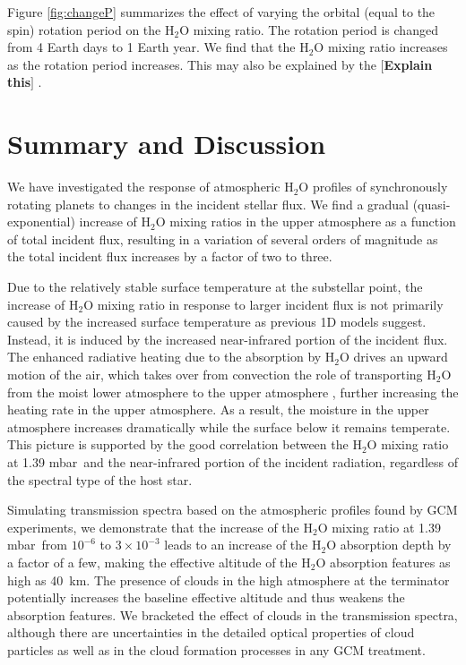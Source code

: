 \documentclass[11pt,numberedappendix,twocolappendix,]{emulateapj}
\def\water{H$_2$O }
\def\preslevel{1.39 mbar\ }
\def\memo#1{\color{red}$[${\bf #1}$]$ \color{black}}
\newcommand{\yf}[1]{{\color{orange}#1}}
\begin{document}
Figure \ref{fig:changeP} summarizes the effect of varying the orbital (equal to the spin) rotation period on the \water mixing ratio. 
The rotation period is changed from 4 Earth days to 1 Earth year. 
We find that the \water mixing ratio increases as the rotation period increases. 
This may also be explained by the 
\memo{Explain this}. 



\section{Summary and Discussion}
\label{s:summary}

We have investigated the response of atmospheric \water profiles of synchronously rotating planets to changes in the incident stellar flux. 
We find a gradual (quasi-exponential) increase of \water mixing ratios in the upper atmosphere as a function of total incident flux, resulting in a variation of several orders of magnitude as the total incident flux increases by a factor of two to three. 

Due to the relatively stable surface temperature at the substellar point, the increase of \water mixing ratio in response to larger incident flux is not primarily caused by the increased surface temperature as previous 1D models suggest. 
Instead, it is induced by the increased near-infrared portion of the incident flux. 
The enhanced radiative heating due to the absorption by \water drives an upward motion of the air, which takes over \yf{from convection} the role of transporting \water from the moist lower atmosphere to the upper atmosphere , further increasing the heating rate in the upper atmosphere.
As a result, the moisture in the upper atmosphere increases dramatically while the surface below it remains temperate. 
This picture is supported by the good correlation between the \water mixing ratio at \preslevel and the near-infrared portion of the incident radiation, regardless of the spectral type of the host star. 

Simulating transmission spectra based on the atmospheric profiles found by GCM experiments, 
we demonstrate that the increase of the \water mixing ratio at \preslevel from $10^{-6}$ to $3 \times 10^{-3}$ leads to an increase of the \water absorption depth by a factor of a few, making the effective altitude of the \water absorption features as high as 40~km. 
The presence of clouds in the high atmosphere at the terminator potentially increases the baseline effective altitude and thus weakens the absorption features. 
We bracketed the effect of clouds in the transmission spectra, 
although there are uncertainties in the detailed optical properties of cloud particles as well as in the cloud formation processes in any GCM treatment. 
\end{document}
